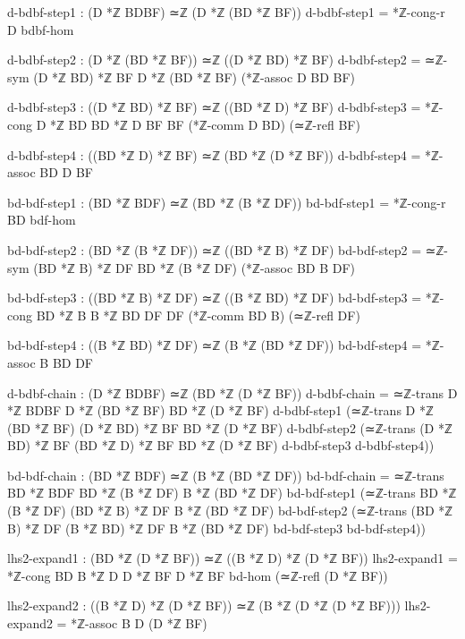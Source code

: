 \documentclass[11pt,a4paper]{book}
\begin{document}
\begin{code}
        d-bdbf-step1 : (D *ℤ BDBF) ≃ℤ (D *ℤ (BD *ℤ BF))
        d-bdbf-step1 = *ℤ-cong-r D bdbf-hom
        
        d-bdbf-step2 : (D *ℤ (BD *ℤ BF)) ≃ℤ ((D *ℤ BD) *ℤ BF)
        d-bdbf-step2 = ≃ℤ-sym {(D *ℤ BD) *ℤ BF} {D *ℤ (BD *ℤ BF)} (*ℤ-assoc D BD BF)
        
        d-bdbf-step3 : ((D *ℤ BD) *ℤ BF) ≃ℤ ((BD *ℤ D) *ℤ BF)
        d-bdbf-step3 = *ℤ-cong {D *ℤ BD} {BD *ℤ D} {BF} {BF} (*ℤ-comm D BD) (≃ℤ-refl BF)
        
        d-bdbf-step4 : ((BD *ℤ D) *ℤ BF) ≃ℤ (BD *ℤ (D *ℤ BF))
        d-bdbf-step4 = *ℤ-assoc BD D BF
        
        bd-bdf-step1 : (BD *ℤ BDF) ≃ℤ (BD *ℤ (B *ℤ DF))
        bd-bdf-step1 = *ℤ-cong-r BD bdf-hom
        
        bd-bdf-step2 : (BD *ℤ (B *ℤ DF)) ≃ℤ ((BD *ℤ B) *ℤ DF)
        bd-bdf-step2 = ≃ℤ-sym {(BD *ℤ B) *ℤ DF} {BD *ℤ (B *ℤ DF)} (*ℤ-assoc BD B DF)
        
        bd-bdf-step3 : ((BD *ℤ B) *ℤ DF) ≃ℤ ((B *ℤ BD) *ℤ DF)
        bd-bdf-step3 = *ℤ-cong {BD *ℤ B} {B *ℤ BD} {DF} {DF} (*ℤ-comm BD B) (≃ℤ-refl DF)
        
        bd-bdf-step4 : ((B *ℤ BD) *ℤ DF) ≃ℤ (B *ℤ (BD *ℤ DF))
        bd-bdf-step4 = *ℤ-assoc B BD DF
        
        d-bdbf-chain : (D *ℤ BDBF) ≃ℤ (BD *ℤ (D *ℤ BF))
        d-bdbf-chain = ≃ℤ-trans {D *ℤ BDBF} {D *ℤ (BD *ℤ BF)} {BD *ℤ (D *ℤ BF)}
                        d-bdbf-step1
                        (≃ℤ-trans {D *ℤ (BD *ℤ BF)} {(D *ℤ BD) *ℤ BF} {BD *ℤ (D *ℤ BF)}
                          d-bdbf-step2
                          (≃ℤ-trans {(D *ℤ BD) *ℤ BF} {(BD *ℤ D) *ℤ BF} {BD *ℤ (D *ℤ BF)}
                            d-bdbf-step3 d-bdbf-step4))
        
        bd-bdf-chain : (BD *ℤ BDF) ≃ℤ (B *ℤ (BD *ℤ DF))
        bd-bdf-chain = ≃ℤ-trans {BD *ℤ BDF} {BD *ℤ (B *ℤ DF)} {B *ℤ (BD *ℤ DF)}
                        bd-bdf-step1
                        (≃ℤ-trans {BD *ℤ (B *ℤ DF)} {(BD *ℤ B) *ℤ DF} {B *ℤ (BD *ℤ DF)}
                          bd-bdf-step2
                          (≃ℤ-trans {(BD *ℤ B) *ℤ DF} {(B *ℤ BD) *ℤ DF} {B *ℤ (BD *ℤ DF)}
                            bd-bdf-step3 bd-bdf-step4))
        
        lhs2-expand1 : (BD *ℤ (D *ℤ BF)) ≃ℤ ((B *ℤ D) *ℤ (D *ℤ BF))
        lhs2-expand1 = *ℤ-cong {BD} {B *ℤ D} {D *ℤ BF} {D *ℤ BF} bd-hom (≃ℤ-refl (D *ℤ BF))
        
        lhs2-expand2 : ((B *ℤ D) *ℤ (D *ℤ BF)) ≃ℤ (B *ℤ (D *ℤ (D *ℤ BF)))
        lhs2-expand2 = *ℤ-assoc B D (D *ℤ BF)
        

\end{code}
\end{document}
